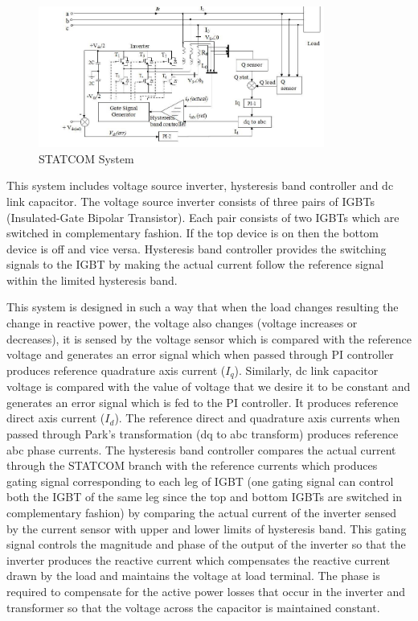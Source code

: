 \documentclass[journal,twoside]{IEEEtran}
\begin{document}
\begin{figure}[!ht]
\includegraphics[width=3.7in]{1}
\caption{STATCOM System}
\label{f1}
\end{figure}

This system includes voltage source inverter, hysteresis band controller and dc link capacitor.
The voltage source inverter consists of three
pairs of IGBTs (Insulated-Gate Bipolar Transistor). Each pair consists of two IGBTs
which are switched in complementary fashion. If
the top device is on then the bottom device is off
and vice versa. Hysteresis
band controller
provides the switching signals to the IGBT by
making the actual current follow the reference
signal within the limited hysteresis band.

\bigskip
This system is designed in such a way that when
the load changes resulting the change in reactive
power, the voltage also changes (voltage
increases or decreases), it is sensed by the
voltage sensor which is compared with the reference voltage and generates an error signal
which when passed through PI controller
produces reference quadrature axis current ($I_q$).
Similarly, dc link capacitor voltage is compared
with the value of voltage that we desire it to be
constant and generates an error signal which is
fed to the PI controller. It produces reference direct
axis current ($I_d$). The reference direct and
quadrature axis currents when passed through
Park’s transformation (dq to abc transform)
produces reference abc phase currents. The
hysteresis band controller compares the actual
current through the STATCOM branch with the
reference currents which produces gating signal
corresponding to each leg of IGBT (one gating
signal can control both the IGBT of the same leg
since the top and bottom IGBTs are switched in complementary fashion) by comparing the
actual current of the inverter sensed by the
current sensor with upper and lower limits of
hysteresis band. This gating signal controls the
magnitude and phase of the output of the
inverter so that the inverter produces the
reactive current which compensates the reactive current drawn by the load and maintains the
voltage at load terminal. The phase is required to
compensate for the active power losses that
occur in the inverter and transformer so that the
voltage across the capacitor is maintained
constant.
\end{document}
